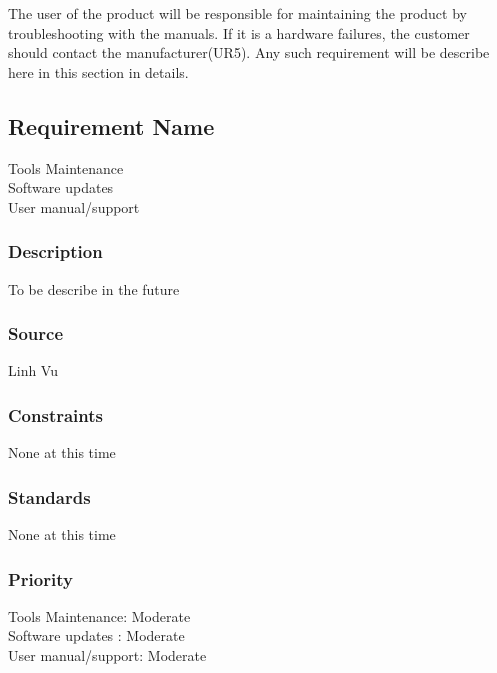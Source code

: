 The user of the product will be responsible for maintaining the product by troubleshooting with the manuals. If it is a hardware failures, the customer should contact the manufacturer(UR5). Any such requirement will be describe here in this section in details.

\subsection{Requirement Name}
Tools Maintenance
\\Software updates
\\User manual/support
\subsubsection{Description}
To be describe in the future
\subsubsection{Source}
Linh Vu
\subsubsection{Constraints}
None at this time
\subsubsection{Standards}
None at this time
\subsubsection{Priority}
Tools Maintenance: Moderate
\\Software updates : Moderate
\\User manual/support: Moderate